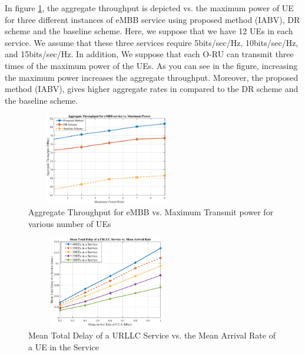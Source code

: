 \documentclass[lettersize,journal]{IEEEtran}
\begin{document}
In figure \ref{fig:5}, the aggregate throughput is depicted vs. the maximum power of UE for three different instances of eMBB service using proposed method (IABV), DR scheme and the baseline scheme. Here, we suppose that we have 12 UEs in each service.  We assume that these three services require 5bits/sec/Hz, 10bits/sec/Hz, and 15bits/sec/Hz.
In addition, We suppose that each O-RU can transmit three times of the maximum power of the UEs. As you can see in the figure, increasing the maximum power increases the aggregate throughput. Moreover, the proposed method (IABV), gives higher aggregate rates in compared to the DR scheme and the baseline scheme.
\begin{figure}%
  \centering
  \captionsetup{justification=centering}
    \includegraphics[width=7cm,height=4cm]{RatePower1.eps}
    \caption{Aggregate Throughput for eMBB vs. Maximum Transmit power for various number of UEs }
  \label{fig:5}
\end{figure}
\begin{figure}
  \centering
  \captionsetup{justification=centering}
      \includegraphics[width=7cm,height=4cm]{delay_new.eps}
  \caption{Mean Total Delay of a URLLC Service vs. the Mean Arrival Rate of a UE in the Service}
  \label{fig:6}
\end{figure}
\end{document}
